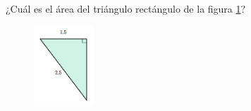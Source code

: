\question[15] ¿Cuál es el área del triángulo rectángulo de la figura \ref{fig:area_rectangulo_01}?
\begin{figure}[H]
    \begin{center}
        \includegraphics[width=0.2\textwidth]{../images/area_rectangulo_01.png}
    \end{center}
    \caption{}
    \label{fig:area_rectangulo_01}
\end{figure}